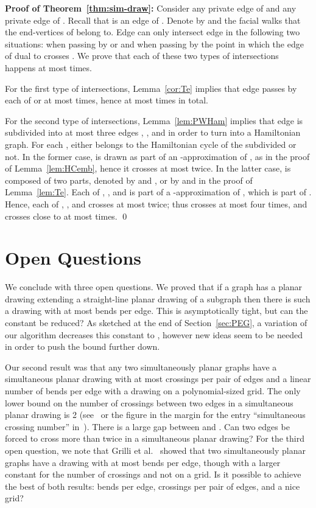 \documentclass{llncs}
\newenvironment{proofof}[1]{\par\addvspace\topsep\noindent
{\bf Proof #1:} \ignorespaces }{\qed}
\begin{document}
\begin{proofof}{of Theorem~\ref{thm:sim-draw}}
Consider any private edge  of  and any private edge  of . Recall that  is an edge of . Denote by  and  the facial walks that the end-vertices of  belong to.
Edge  can only intersect edge  in the following two situations:
when passing by  or  and when passing by the point  in which the edge of  dual to  crosses . We prove that each of these two types of intersections happens at most  times.

For the first type of intersections, Lemma~\ref{cor:Te} implies that edge  passes by each of  or  at most  times, hence at most  times in total.

For the second type of intersections, Lemma~\ref{lem:PWHam} implies that edge  is subdivided into at most three edges , , and  in order to turn  into a Hamiltonian graph. For each ,  either belongs to the Hamiltonian cycle of the subdivided  or not. In the former case,  is drawn as part of an -approximation  of , as in the proof of Lemma~\ref{lem:HCemb}, hence it crosses  at most twice. In the latter case,  is composed of two parts, denoted by  and , or by  and  in the proof of Lemma~\ref{lem:Te}. Each of , ,  and  is part of a -approximation of , which is part of . Hence, each of , ,  and  crosses  at most twice; thus  crosses  at most four times, and  crosses  close to  at most  times.
\end{proofof}


\section{Open Questions}

We conclude with three open questions.
We proved that if a graph has a planar drawing extending a straight-line planar drawing of a subgraph then there is such a drawing with at most  bends per edge.  This is asymptotically tight, but can the constant  be reduced? As sketched at the end of Section~\ref{sec:PEG}, a variation of our algorithm decreases this constant to , however new ideas seem to be needed in order to push the bound further down.

Our second result was that any two simultaneously planar graphs have a simultaneous planar drawing with at most  crossings per pair of edges and a linear number of bends per edge with a drawing on a polynomial-sized grid.  The only lower bound on the number of crossings between two edges in a simultaneous planar drawing is 2 (see~\cite{CJS08} or the figure in the margin for the entry ``simultaneous crossing number'' in~\cite{S13b}).  There is a large gap between  and .  Can two edges be forced to cross more than twice in a simultaneous planar drawing?
For the third open question, we note that
Grilli et al.~\cite{Grilli2014} showed that two simultaneously planar graphs have a drawing with at most  bends per edge, though with a larger constant for the number of crossings and not on a grid.  Is it possible to achieve the best of both results:   bends per edge,  crossings per pair of edges, and a nice grid?





\end{document}
